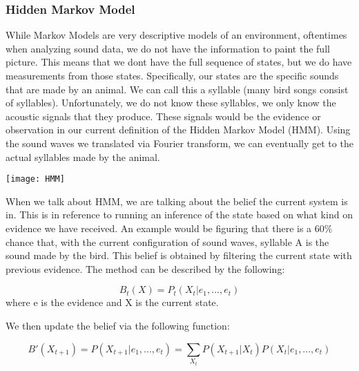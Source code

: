\subsubsection{Hidden Markov Model}
While Markov Models are very descriptive models of an environment, oftentimes when analyzing sound data, we do not have the information to paint the full picture. This means that we don\textquotesingle t have the full sequence of states, but we do have measurements from those states. Specifically, our states are the specific sounds that are made by an animal. We can call this a syllable (many bird songs consist of syllables). Unfortunately, we do not know these syllables, we only know the acoustic signals that they produce. These signals would be the evidence or observation in our current definition of the Hidden Markov Model (HMM). Using the sound waves we translated via Fourier transform, we can eventually get to the actual syllables made by the animal.\par

\begin{center}
  \texttt{[image: HMM]}
\end{center}

When we talk about HMM, we are talking about the belief the current system is in. This is in reference to running an inference of the state based on what kind on evidence we have received. An example would be figuring that there is a 60\% chance that, with the current configuration of sound waves, syllable A is the sound made by the bird. This belief is obtained by filtering the current state with previous evidence. The method can be described by the following:\par

\vspace{-32px}
\begin{center}
  \begin{equation}
    B_{t}(X)
    = P_{t}(X_{t} | e_{1}, ..., e_{t})
  \end{equation}
  where e is the evidence and X is the current state.
\end{center}

We then update the belief via the following function:\par

\vspace{-32px}
\begin{center}
  \begin{equation}
    B'(X_{t+1})
    = P(X_{t+1} | e_{1}, ..., e_{t})
    = \sum_{X_{t}} P(X_{t+1} | X_{t}) P(X_{t} | e_{1}, ..., e_{t})
  \end{equation}
\end{center}

